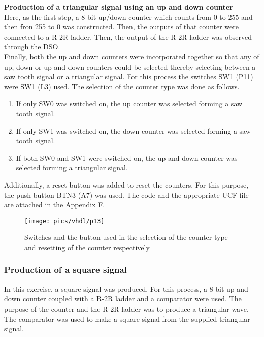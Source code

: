 \noindent
\textbf{Production of a triangular signal using an up and down counter}\\

\noindent
Here, as the first step, a 8 bit up/down counter which counts from 0 to 255 and then fron 255 to 0 was constructed. Then, the outputs of that counter were connected to a R-2R ladder. Then, the output of the  R-2R ladder was observed through the DSO.\\

\noindent
Finally, both the up and down counters were incorporated together so that any of up, down or up and down counters could be selected thereby selecting between a saw tooth signal or a triangular signal. For this process the switches SW1 (P11) were SW1 (L3) used. The selection of the counter type was done as follows.
\begin{enumerate}
	\item If only SW0 was switched on, the up counter was selected forming a saw tooth signal.
	\item  If only SW1 was switched on, the down counter was selected forming a saw tooth signal.
	\item If both SW0 and SW1 were switched on, the up and down counter was selected forming a triangular signal.
\end{enumerate}

\noindent
Additionally, a reset button was added to reset the counters. For this purpose, the push button BTN3 (A7) was used. The  code and the appropriate UCF file are attached in the Appendix F.

\begin{figure}[!h]
	\centering
	\texttt{[image: pics/vhdl/p13]}
	\caption{Switches and the  button used in the selection of the counter type and resetting of the counter respectively}
	\label{fig:basicr8}
\end{figure}

\subsubsection{Production of a square signal}

\noindent
In this exercise, a square signal was produced. For this process, a  8 bit up and down counter coupled with a R-2R ladder and a comparator  were used. The purpose of the counter and the R-2R ladder was to produce a triangular wave. The comparator was used to make a square signal from the supplied triangular signal. \\


